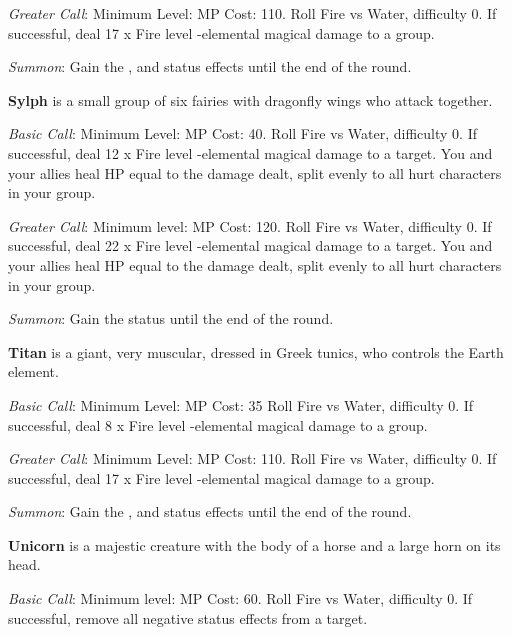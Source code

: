 \begin{multicols}{2}
    \textit{Greater Call}: Minimum Level:  MP Cost: 110. Roll Fire vs Water, difficulty 0. If successful, deal 17 x Fire level -elemental magical damage to a group.
    
    \textit{Summon}: Gain the  ,   and   status effects until the end of the round.
    
    \textbf{Sylph} is a small group of six fairies with dragonfly wings who attack together.
    
    \textit{Basic Call}: Minimum Level:  MP Cost: 40. Roll Fire vs Water, difficulty 0. If successful, deal 12 x Fire level -elemental magical damage to a target. You and your allies heal HP equal to the damage dealt, split evenly to all hurt characters in your group.
    
    \textit{Greater Call}: Minimum level:  MP Cost: 120. Roll Fire vs Water, difficulty 0. If successful, deal 22 x Fire level -elemental magical damage to a target. You and your allies heal HP equal to the damage dealt, split evenly to all hurt characters in your group.
    
    \textit{Summon}: Gain the  status until the end of the round.
    
    \textbf{Titan} is a giant, very muscular, dressed in Greek tunics, who controls the Earth element.
    
    \textit{Basic Call}: Minimum Level:  MP Cost: 35 Roll Fire vs Water, difficulty 0. If successful, deal 8 x Fire level -elemental magical damage to a group.
    
    \textit{Greater Call}: Minimum Level:  MP Cost: 110. Roll Fire vs Water, difficulty 0. If successful, deal 17 x Fire level -elemental magical damage to a group.
    
    \textit{Summon}: Gain the  ,   and   status effects until the end of the round.
    
    \textbf{Unicorn} is a majestic creature with the body of a horse and a large horn on its head.
    
    \textit{Basic Call}: Minimum level:  MP Cost: 60. Roll Fire vs Water, difficulty 0. If successful, remove all negative status effects from a target.
    

\end{multicols}
